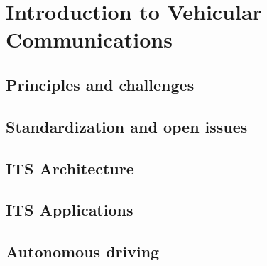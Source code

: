 \chapter{Introduction to Vehicular Communications}
\section{Principles and challenges}
\section{Standardization and open issues}
\section{ITS Architecture}
\section{ITS Applications}
\section{Autonomous driving}
